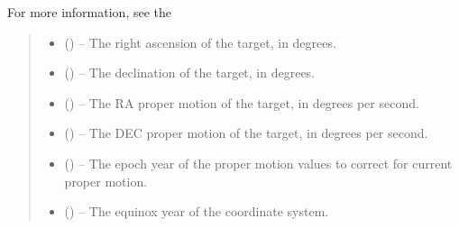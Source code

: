 \documentclass[letterpaper,11pt,english]{sphinxmanual}
\begin{document}
\begin{savenotes}
\begin{fulllineitems}
\sphinxAtStartPar
For more information, see the
%
\begin{footnote}[103]\sphinxAtStartFootnote
{}
%
\end{footnote}
\begin{quote}\begin{description}
\begin{itemize}
\item {} 
\sphinxAtStartPar
{} () – The right ascension of the target, in degrees.

\item {} 
\sphinxAtStartPar
{} () – The declination of the target, in degrees.

\item {} 
\sphinxAtStartPar
{} (\sphinxstyleliteralemphasis{\sphinxupquote{, }}) – The RA proper motion of the target, in degrees per second.

\item {} 
\sphinxAtStartPar
{} (\sphinxstyleliteralemphasis{\sphinxupquote{, }}) – The DEC proper motion of the target, in degrees per second.

\item {} 
\sphinxAtStartPar
{} (\sphinxstyleliteralemphasis{\sphinxupquote{, }}) – The epoch year of the proper motion values to correct for current
proper motion.

\item {} 
\sphinxAtStartPar
{} (\sphinxstyleliteralemphasis{\sphinxupquote{, }}) – The equinox year of the coordinate system.


\end{itemize}
\end{description}
\end{quote}
\end{fulllineitems}
\end{savenotes}
\end{document}
